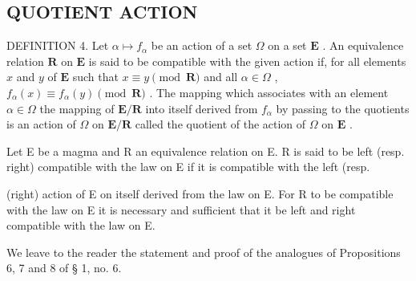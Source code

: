 \subsection{QUOTIENT ACTION}

DEFINITION 4. Let \(\alpha \mapsto f_{\alpha}\) be an action of a set \(\Omega\) on a set \(\mathbf{E}\) . An equivalence relation \(\mathbf{R}\) on \(\mathbf{E}\) is said to be compatible with the given action if, for all elements \(x\) and \(y\) of \(\mathbf{E}\) such that \(x \equiv y \pmod{\mathbf{R}}\) and all \(\alpha \in \Omega\) , \(f_{\alpha}(x) \equiv f_{\alpha}(y) \pmod{\mathbf{R}}\) . The mapping which associates with an element \(\alpha \in \Omega\) the mapping of \(\mathbf{E} / \mathbf{R}\) into itself derived from \(f_{\alpha}\) by passing to the quotients is an action of \(\Omega\) on \(\mathbf{E} / \mathbf{R}\) called the quotient of the action of \(\Omega\) on \(\mathbf{E}\) .

Let E be a magma and R an equivalence relation on E. R is said to be left (resp. right) compatible with the law on E if it is compatible with the left (resp.

(right) action of E on itself derived from the law on E. For R to be compatible with the law on E it is necessary and sufficient that it be left and right compatible with the law on E.

We leave to the reader the statement and proof of the analogues of Propositions 6, 7 and 8 of § 1, no. 6.
\relax{}
